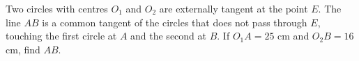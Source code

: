 Two circles with centres $O_1$ and $O_2$ are externally tangent at the point $E$. The line $AB$ is a common tangent of the circles that does not pass through $E$, touching the first circle at $A$ and the second at $B$. If $O_1A=25$ cm and $O_2B=16$ cm, find $AB$.
